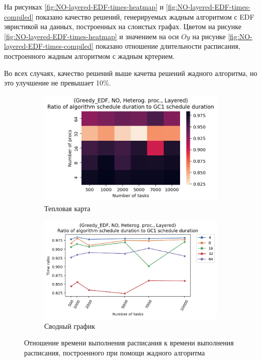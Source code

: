 На рисунках \ref{fig:NO-layered-EDF-times-heatmap} и \ref{fig:NO-layered-EDF-times-compiled} показано качество решений, генерируемых жадным алгоритмом с EDF эвристикой на данных, построенных на слоистых графах. Цветом на рисунке \ref{fig:NO-layered-EDF-times-heatmap} и значением на оси $Oy$ на рисунке \ref{fig:NO-layered-EDF-times-compiled} показано отношение длительности расписания, построенного жадным алгоритмом с жадным кртерием.

Во всех случаях, качество решений выше качетва решений жадного алгоритма, но это улучшение не превышает 10\%.

\begin{figure}[!htbp]
    \centering
    \begin{subfigure}{0.49\textwidth}
        \includegraphics[width=\textwidth]{imgs/unbalanced/NO_EDF/times.png}
        \caption{Тепловая карта}
        \label{fig:NO-disbalanced-EDF-times-heatmap}
    \end{subfigure}
    \hfill
    \begin{subfigure}{0.49\textwidth}
        \includegraphics[width=\textwidth]{imgs/unbalanced/NO_EDF/gr_amalgamated.png}
        \caption{Сводный график}
        \label{fig:NO-disbalanced-EDF-times-compiled}
    \end{subfigure}
    \caption{Отношение времени выполнения расписания к времени выполнения расписания, построенного при помощи жадного алгоритма}
\end{figure}

